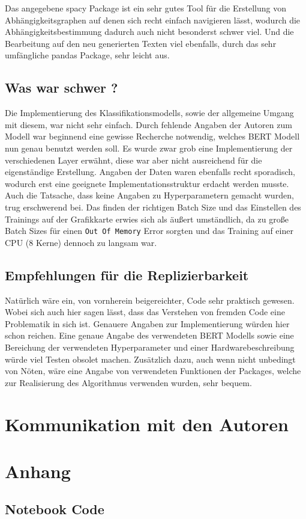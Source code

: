 \documentclass[DIV=13,fontsize=11pt]{scrartcl}
\begin{document}
Das angegebene spacy Package ist ein sehr gutes Tool für die Erstellung von Abhängigkeitsgraphen auf denen sich recht
einfach navigieren lässt, wodurch die Abhängigkeitsbestimmung dadurch auch nicht besonderst schwer viel. Und die Bearbeitung
auf den neu generierten Texten viel ebenfalls, durch das sehr umfängliche pandas Package, sehr leicht aus.

\subsection{Was war schwer ?}
Die Implementierung des Klassifikationsmodells, sowie der allgemeine Umgang mit diesem, war nicht sehr einfach.
Durch fehlende Angaben der Autoren zum Modell war beginnend eine gewisse Recherche notwendig, welches BERT Modell nun genau
benutzt werden soll. Es wurde zwar grob eine Implementierung der verschiedenen Layer erwähnt, diese war aber nicht ausreichend
für die eigenständige Erstellung. Angaben der Daten waren ebenfalls recht sporadisch, wodurch erst eine geeignete Implementationsstruktur
erdacht werden musste. Auch die Tatsache, dass keine Angaben zu Hyperparametern gemacht wurden, trug erschwerend bei. Das finden der richtigen
Batch Size und das Einstellen des Trainings auf der Grafikkarte erwies sich als äußert umständlich, da zu große Batch Sizes für einen
\texttt{Out Of Memory} Error sorgten und das Training auf einer CPU (8 Kerne) dennoch zu langsam war.

\subsection{Empfehlungen für die Replizierbarkeit}
Natürlich wäre ein, von vornherein beigereichter, Code sehr praktisch gewesen. Wobei sich auch hier sagen lässt, dass das Verstehen von
fremden Code eine Problematik in sich ist. Genauere Angaben zur Implementierung würden hier schon reichen. Eine genaue Angabe des verwendeten
BERT Modells sowie eine Bereichung der verwendeten Hyperparameter und einer Hardwarebeschreibung würde viel Testen obsolet machen.
Zusätzlich dazu, auch wenn nicht unbedingt von Nöten, wäre eine Angabe von verwendeten Funktionen der Packages, welche zur Realisierung
des Algorithmus verwenden wurden, sehr bequem.

\section{Kommunikation mit den Autoren}

\section{Anhang}

\subsection{Notebook Code}


\end{document}
